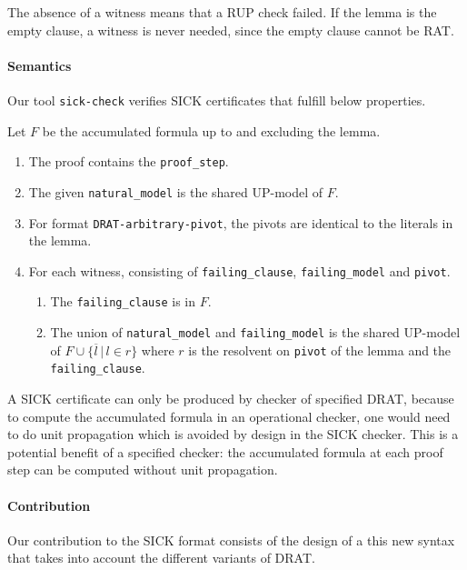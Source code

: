 \documentclass[
]{report}
\providecommand{\tightlist}{%
  \setlength{\itemsep}{0pt}\setlength{\parskip}{0pt}}
\begin{document}
The absence of a witness means that a RUP check failed. If the lemma is
the empty clause, a witness is never needed, since the empty clause
cannot be RAT.

\paragraph{Semantics}

Our tool \texttt{sick-check} verifies SICK certificates that fulfill
below properties.

Let \(F\) be the accumulated formula up to and excluding the lemma.

\begin{enumerate}
\def\labelenumi{\arabic{enumi}.}
\tightlist
\item
  The proof contains the \texttt{proof\_step}.
\item
  The given \texttt{natural\_model} is the shared UP-model of \(F\).
\item
  For format \texttt{DRAT-arbitrary-pivot}, the pivots are identical to
  the literals in the lemma.
\item
  For each witness, consisting of \texttt{failing\_clause},
  \texttt{failing\_model} and \texttt{pivot}.

  \begin{enumerate}
  \def\labelenumii{\arabic{enumii}.}
  \tightlist
  \item
    The \texttt{failing\_clause} is in \(F\).
  \item
    The union of \texttt{natural\_model} and \texttt{failing\_model} is
    the shared UP-model of \(F \cup \{ \overline{l} \,|\, l \in r\}\)
    where \(r\) is the resolvent on \texttt{pivot} of the lemma and the
    \texttt{failing\_clause}.
  \end{enumerate}
\end{enumerate}

A SICK certificate can only be produced by checker of specified DRAT,
because to compute the accumulated formula in an operational checker,
one would need to do unit propagation which is avoided by design in the
SICK checker. This is a potential benefit of a specified checker: the
accumulated formula at each proof step can be computed without unit
propagation.

\paragraph{Contribution}

Our contribution to the SICK format consists of the design of a this new
syntax that takes into account the different variants of DRAT.
\end{document}
